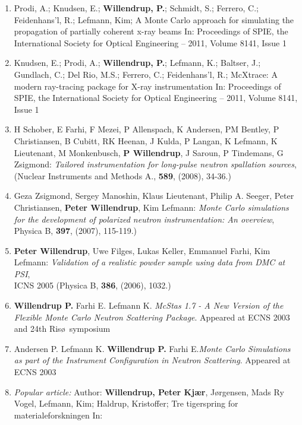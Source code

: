 \begin{enumerate}
  \item Prodi, A.; Knudsen, E.; {\bf Willendrup, P.}; Schmidt, S.; Ferrero, C.; Feidenhans'l, R.; Lefmann, Kim; A Monte Carlo approach for simulating the propagation of partially coherent x-ray beams In: Proceedings of SPIE, the International Society for Optical Engineering -- 2011, Volume 8141, Issue 1
  \item Knudsen, E.; Prodi, A.; {\bf Willendrup, P.}; Lefmann, K.; Baltser, J.; Gundlach, C.; Del Rio, M.S.; Ferrero, C.; Feidenhans'l, R.; McXtrace: A modern ray-tracing package for X-ray instrumentation In: Proceedings of SPIE, the International Society for Optical Engineering -- 2011, Volume 8141, Issue 1
  \item{H Schober, E Farhi, F Mezei, P Allenspach, K Andersen, PM
      Bentley, P Christiansen, B Cubitt, RK Heenan, J Kulda, P Langan, K
      Lefmann, K Lieutenant, M Monkenbusch, {\bf P Willendrup}, J Saroun, P
      Tindemans, G Zsigmond: \emph{Tailored instrumentation for long-pulse neutron spallation sources},  (Nuclear Instruments and Methods A., {\bf 589}, (2008),
      34-36.)}
  \item{Geza Zsigmond, Sergey Manoshin, Klaus Lieutenant, Philip
      A. Seeger, Peter Christiansen, {\bf Peter  Willendrup},
      Kim Lefmann: \emph{Monte Carlo simulations for the development of polarized neutron instrumentation: An overview}, Physica B, {\bf 397}, (2007),
      115-119.)}
  \item{{\bf Peter Willendrup}, Uwe Filges, Lukas Keller, Emmanuel Farhi, Kim
      Lefmann: \emph{Validation of a realistic powder sample using data
        from DMC at PSI}, \\ICNS
        2005 (Physica B, {\bf 386}, (2006),
      1032.)}
  \item{{\bf Willendrup P.} Farhi E. Lefmann K. \emph{McStas 1.7 - A New
        Version of the Flexible Monte Carlo Neutron Scattering
        Package}. Appeared at ECNS 2003 and 24th Ris\o\ symposium}
  \item{Andersen P. Lefmann K. {\bf Willendrup P.} Farhi E.\emph{Monte Carlo
        Simulations as part of the Instrument Configuration in Neutron
        Scattering}. Appeared at ECNS 2003}
  \item{\emph{Popular article:} Author: {\bf Willendrup, Peter
      Kj\ae r}, J\o rgensen, Mads Ry Vogel, Lefmann, Kim; Haldrup,
    Kristoffer; Tre tigerspring for materialeforskningen In: \\}

\end{enumerate}
